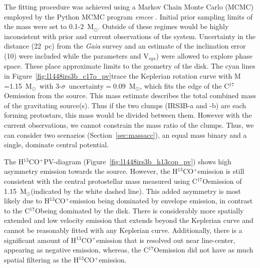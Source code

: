 \documentclass[twocolumn, 12pt,trackchanges]{aastex63}
\newcommand{\cso}{C$^{17}$O}
\newcommand{\htcop}{H$^{13}$CO$^+$}
\renewcommand{\deg}{\degr}
\newcommand{\solm}{M$_{\odot}$}
\begin{document}
The fitting procedure was achieved using a Markov Chain Monte Carlo (MCMC) employed by the Python MCMC program  \textit{emcee} \citep{2013PASP..125..306F}. Initial prior sampling limits of the mass were set to 0.1-2~\solm. Outside of these regimes would be highly inconsistent with prior and current observations of the system. Uncertainty in the distance (22~pc) from the \textit{Gaia} survey \citep[][]{2018arXiv180803499O} and an estimate of the inclination error (10\deg) were included while the parameters  and V$_{sys}$) were allowed to explore phase space. These place approximate limits to the geometry of the disk. The cyan lines in Figure~\ref{fig:l1448irs3b_c17o_pv}\space trace the Keplerian rotation curve with M$_{\*}$=1.15~\solm~with 3-$\sigma$~uncertainty$=0.09$~\solm, which fits the edge of the \cso\space emission from the source. This mass estimate describes the total combined mass of the gravitating source(s). Thus if the two clumps (IRS3B-a and -b) are each forming protostars, this mass would be divided between them. However with the current observations, we cannot constrain the mass ratio of the clumps. Thus, we can consider two scenarios (Section~\ref{sec:massacc}), an equal mass binary and a single, dominate central potential.

The \htcop\space PV-diagram (Figure~\ref{fig:l1448irs3b_h13cop_pv}) shows high asymmetry emission towards the source. However, the \htcop\space emission is still consistent with the central protostellar mass measured using \cso\space emission of 1.15~\solm\space(indicated by the white dashed line). This added asymmetry is most likely due to \htcop\space emission being dominated by envelope emission, in contrast to the \cso\space being dominated by the disk. There is considerably more spatially extended and low velocity emission that extends beyond the Keplerian curve and cannot be reasonably fitted with any Keplerian curve. Additionally, there is a significant amount of \htcop\space emission that is resolved out near line-center, appearing as negative emission, whereas, the \cso\space emission did not have as much spatial filtering as the \htcop\space emission.
\end{document}
